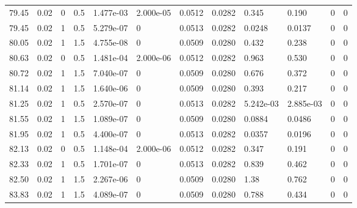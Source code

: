 \documentclass[preview]{standalone}
\begin{document}
{{{{{{\begin{tabular}{L{1.2cm}C{1.2cm} C{0.3cm}C{0.5cm} C{1.4cm}C{1.4cm} C{1.4cm}C{1.4cm} C{1.6cm}C{1.6cm} C{1.6cm}C{1.6cm}}
  79.45  &  0.02  & 0     & 0.5 &  1.477e-03  & 2.000e-05  &  0.0512&   0.0282& 0.345 & 0.190   &  0 & 0  \\ 
  79.45  &  0.02  & 1     & 0.5 &  5.279e-07  & 0  &  0.0513&   0.0282& 0.0248 & 0.0137   &  0 & 0  \\ 
  80.05  &  0.02  & 1     & 1.5 &  4.755e-08  & 0  &  0.0509&   0.0280& 0.432 & 0.238   &  0 & 0  \\ 
  80.63  &  0.02  & 0     & 0.5 &  1.481e-04  & 2.000e-06  &  0.0512&   0.0282& 0.963 & 0.530   &  0 & 0  \\ 
  80.72  &  0.02  & 1     & 1.5 &  7.040e-07  & 0  &  0.0509&   0.0280& 0.676 & 0.372   &  0 & 0  \\ 
  81.14  &  0.02  & 1     & 1.5 &  1.640e-06  & 0  &  0.0509&   0.0280& 0.393 & 0.217   &  0 & 0  \\ 
  81.25  &  0.02  & 1     & 0.5 &  2.570e-07  & 0  &  0.0513&   0.0282& 5.242e-03 & 2.885e-03   &  0 & 0  \\ 
  81.55  &  0.02  & 1     & 1.5 &  1.089e-07  & 0  &  0.0509&   0.0280& 0.0884 & 0.0486   &  0 & 0  \\ 
  81.95  &  0.02  & 1     & 0.5 &  4.400e-07  & 0  &  0.0513&   0.0282& 0.0357 & 0.0196   &  0 & 0  \\ 
  82.13  &  0.02  & 0     & 0.5 &  1.148e-04  & 2.000e-06  &  0.0512&   0.0282& 0.347 & 0.191   &  0 & 0  \\ 
  82.33  &  0.02  & 1     & 0.5 &  1.701e-07  & 0  &  0.0513&   0.0282& 0.839 & 0.462   &  0 & 0  \\ 
  82.50  &  0.02  & 1     & 1.5 &  2.267e-06  & 0  &  0.0509&   0.0280& 1.38 & 0.762   &  0 & 0  \\ 
  83.83  &  0.02  & 1     & 1.5 &  4.089e-07  & 0  &  0.0509&   0.0280& 0.788 & 0.434   &  0 & 0  \\ 
\hline 
\end{tabular} 

}}}}}}
\end{document}

